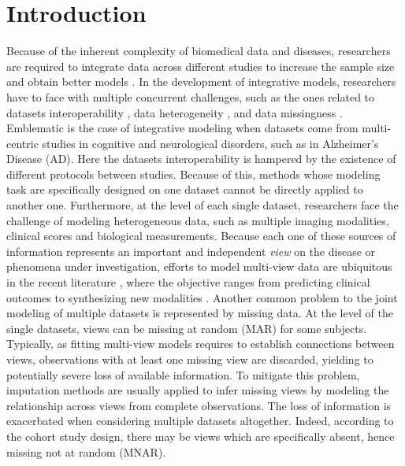 \section{Introduction}

Because of the inherent complexity of biomedical data and diseases,
researchers are required to integrate data across different studies to increase the sample size and obtain better models \citep{LeSueur2020}.
%
In the development of integrative models, researchers have to face with multiple concurrent challenges, such as the ones related to
datasets interoperability \citep{Tognin2020},
data heterogeneity \citep{Buch2020},
and data missingness \citep{GolrizKhatami2020}.
%
Emblematic is the case of integrative modeling when datasets come from multi-centric studies in cognitive and neurological disorders,
such as in Alzheimer's Disease (AD).
%
Here the datasets interoperability is hampered by the existence of different protocols between studies.
Because of this, methods whose modeling task are specifically designed on one dataset cannot be directly applied to another one.
%
Furthermore, at the level of each single dataset, researchers face the challenge of modeling heterogeneous data,
such as multiple imaging modalities, clinical scores and biological measurements.
Because each one of these sources of information represents an important and independent \textit{view} on the disease or phenomena under investigation,
efforts to model multi-view data are ubiquitous in the recent literature \citep{Vieira2020}, where the objective ranges from predicting clinical outcomes \citep{Chen2019} to synthesizing new modalities \citep{Zhou2020, Wei2019}.
%
Another common problem to the joint modeling of multiple datasets is represented by missing data.
At the level of the single datasets, views can be missing at random (MAR) for some subjects.
Typically, as fitting multi-view models requires to establish connections between views, observations with at least one missing view are discarded, yielding to potentially severe loss of available information.
To mitigate this problem, imputation methods are usually applied to infer missing views by modeling the relationship across views from complete observations.
%
The loss of information is exacerbated when considering multiple datasets altogether.
Indeed, according to the cohort study design, there may be views which are specifically absent, hence missing not at random (MNAR).
